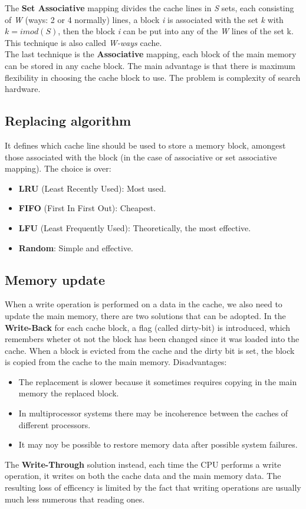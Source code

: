 \documentclass[12pt]{article}
\begin{document}
The \textbf{Set Associative} mapping divides the cache lines in \textit{S} sets, each consisting of \textit{W} (ways: 2 or 4 normally) lines, a block \textit{i} is associated with the set \textit{k} with $k = i mod(S)$, then the block \textit{i} can be put into any of the \textit{W} lines of the set k. This technique is also called \textit{W-ways} cache.\\
The last technique is the \textbf{Associative} mapping, each block of the main memory can be stored in any cache block. The main advantage is that there is maximum flexibility in choosing the cache block to use. The problem is complexity of search hardware.

\subsection{Replacing algorithm}
It defines which cache line should be used to store a memory block, amongest those associated with the block (in the case of associative or set associative mapping). The choice is over:
\begin{itemize}
  \item \textbf{LRU} (Least Recently Used): Most used.
  \item \textbf{FIFO} (First In First Out): Cheapest.
  \item \textbf{LFU} (Least Frequently Used): Theoretically, the most effective.
  \item \textbf{Random}: Simple and effective.
\end{itemize}

\subsection{Memory update}
When a write operation is performed on a data in the cache, we also need to update the main memory, there are two solutions that can be adopted. In the \textbf{Write-Back} for each cache block, a flag (called dirty-bit) is introduced, which remembers wheter ot not the block has been changed since it was loaded into the cache. When a block is evicted from the cache and the dirty bit is set, the block is copied from the cache to the main memory. Disadvantages:
\begin{itemize}
  \item The replacement is slower because it sometimes requires copying in the main memory the replaced block.
  \item In multiprocessor systems there may be incoherence between the caches of different processors.
  \item It may noy be possible to restore memory data after possible system failures.
\end{itemize}
The \textbf{Write-Through} solution instead, each time the CPU performs a write operation, it writes on both the cache data and the main memory data. The resulting loss of efficency is limited by the fact that writing operations are usually much less numerous that reading ones.
\end{document}
